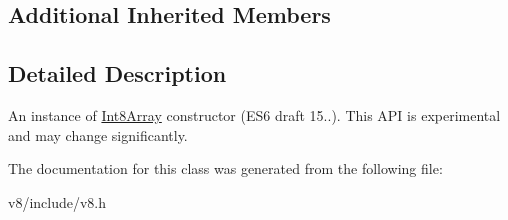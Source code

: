 \subsection*{Additional Inherited Members}


\subsection{Detailed Description}
An instance of \hyperlink{classv8_1_1Int8Array}{Int8\+Array} constructor (E\+S6 draft 15..). This A\+P\+I is experimental and may change significantly. 

The documentation for this class was generated from the following file\+:\begin{DoxyCompactItemize}
\item 
v8/include/v8.\+h\end{DoxyCompactItemize}
